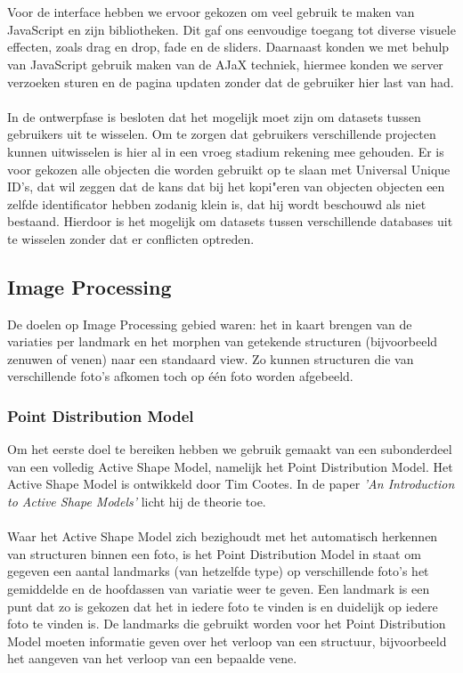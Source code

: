 \\
\\
Voor de interface hebben we ervoor gekozen om veel gebruik te maken van JavaScript en zijn bibliotheken. Dit gaf ons eenvoudige toegang tot diverse visuele effecten, zoals drag en drop, fade en de sliders. Daarnaast konden we met behulp van JavaScript gebruik maken van de AJaX techniek, hiermee konden we server verzoeken sturen en de pagina updaten zonder dat de gebruiker hier last van had.
\\
\\
In de ontwerpfase is besloten dat het mogelijk moet zijn om datasets tussen gebruikers uit te wisselen. Om te zorgen dat gebruikers verschillende projecten kunnen uitwisselen is hier al in een vroeg stadium rekening mee gehouden. Er is voor gekozen alle objecten die worden gebruikt op te slaan met Universal Unique ID's, dat wil zeggen dat de kans dat bij het kopi"{e}ren van objecten objecten een zelfde identificator hebben zodanig klein is, dat hij wordt beschouwd als niet bestaand. Hierdoor is het mogelijk om datasets tussen verschillende databases uit te wisselen zonder dat er conflicten optreden.

\subsection{Image Processing}
\label{aanpak_image_processing}
De doelen op Image Processing gebied waren: het in kaart brengen van de variaties per landmark en het morphen van getekende structuren (bijvoorbeeld zenuwen of venen) naar een standaard view. Zo kunnen structuren die van verschillende foto's afkomen toch op \'{e}\'{e}n foto worden afgebeeld.

\subsubsection{Point Distribution Model}
Om het eerste doel te bereiken hebben we gebruik gemaakt van een subonderdeel van een volledig Active Shape Model, namelijk het Point Distribution Model. Het Active Shape Model is ontwikkeld door Tim Cootes. In de paper \emph{'An Introduction to Active Shape Models'} licht hij de theorie toe.\cite{introASM}
\\
\\
Waar het Active Shape Model zich bezighoudt met het automatisch herkennen van structuren binnen een foto, is het Point Distribution Model \cite{pdm} in staat om gegeven een aantal landmarks (van hetzelfde type) op verschillende foto's het gemiddelde en de hoofdassen van variatie weer te geven. Een landmark is een punt dat zo is gekozen dat het in iedere foto te vinden is en duidelijk op iedere foto te vinden is. De landmarks die gebruikt worden voor het Point Distribution Model moeten informatie geven over het verloop van een structuur, bijvoorbeeld het aangeven van het verloop van een bepaalde vene.

